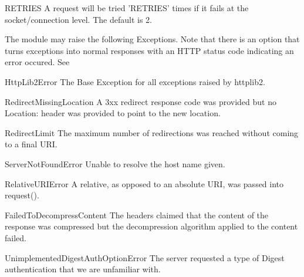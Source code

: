 \begin{datadesc}{RETRIES}
A request will be tried 'RETRIES' times if it fails at the socket/connection level.
The default is 2.
\end{datadesc}


The  module may raise the following Exceptions. Note that 
there is an option that turns exceptions into 
normal responses with an HTTP status code indicating
an error occured. See 

\begin{excdesc}{HttpLib2Error}
The Base Exception for all exceptions raised by httplib2.
\end{excdesc}

\begin{excdesc}{RedirectMissingLocation}
A 3xx redirect response code was provided but no Location: header 
was provided to point to the new location.
\end{excdesc}

\begin{excdesc}{RedirectLimit}
The maximum number of redirections was reached without coming to a final URI.
\end{excdesc}


\begin{excdesc}{ServerNotFoundError}
Unable to resolve the host name given.
\end{excdesc}

\begin{excdesc}{RelativeURIError}
A relative, as opposed to an absolute URI, was passed into request().
\end{excdesc}

\begin{excdesc}{FailedToDecompressContent}
The headers claimed that the content of the response was compressed but the
decompression algorithm applied to the content failed.
\end{excdesc}

\begin{excdesc}{UnimplementedDigestAuthOptionError}
The server requested a type of Digest authentication that we
are unfamiliar with.
\end{excdesc}

